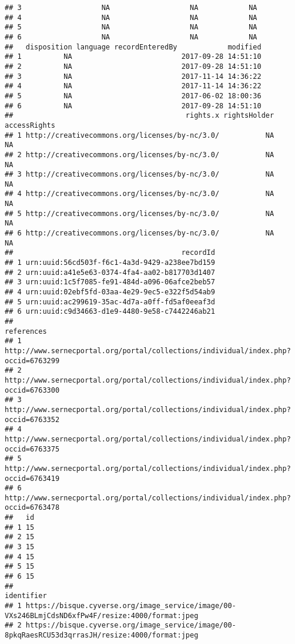 \documentclass[
]{article}
\begin{document}
\begin{verbatim}
## 3                   NA                   NA            NA                  
## 4                   NA                   NA            NA                  
## 5                   NA                   NA            NA                  
## 6                   NA                   NA            NA                  
##   disposition language recordEnteredBy            modified
## 1          NA                          2017-09-28 14:51:10
## 2          NA                          2017-09-28 14:51:10
## 3          NA                          2017-11-14 14:36:22
## 4          NA                          2017-11-14 14:36:22
## 5          NA                          2017-06-02 18:00:36
## 6          NA                          2017-09-28 14:51:10
##                                         rights.x rightsHolder accessRights
## 1 http://creativecommons.org/licenses/by-nc/3.0/           NA           NA
## 2 http://creativecommons.org/licenses/by-nc/3.0/           NA           NA
## 3 http://creativecommons.org/licenses/by-nc/3.0/           NA           NA
## 4 http://creativecommons.org/licenses/by-nc/3.0/           NA           NA
## 5 http://creativecommons.org/licenses/by-nc/3.0/           NA           NA
## 6 http://creativecommons.org/licenses/by-nc/3.0/           NA           NA
##                                        recordId
## 1 urn:uuid:56cd503f-f6c1-4a3d-9429-a238ee7bd159
## 2 urn:uuid:a41e5e63-0374-4fa4-aa02-b817703d1407
## 3 urn:uuid:1c5f7085-fe91-484d-a096-06afce2beb57
## 4 urn:uuid:02ebf5fd-03aa-4e29-9ec5-e322f5d54ab9
## 5 urn:uuid:ac299619-35ac-4d7a-a0ff-fd5af0eeaf3d
## 6 urn:uuid:c9d34663-d1e9-4480-9e58-c7442246ab21
##                                                                          references
## 1 http://www.sernecportal.org/portal/collections/individual/index.php?occid=6763299
## 2 http://www.sernecportal.org/portal/collections/individual/index.php?occid=6763300
## 3 http://www.sernecportal.org/portal/collections/individual/index.php?occid=6763352
## 4 http://www.sernecportal.org/portal/collections/individual/index.php?occid=6763375
## 5 http://www.sernecportal.org/portal/collections/individual/index.php?occid=6763419
## 6 http://www.sernecportal.org/portal/collections/individual/index.php?occid=6763478
##   id
## 1 15
## 2 15
## 3 15
## 4 15
## 5 15
## 6 15
##                                                                                         identifier
## 1 https://bisque.cyverse.org/image_service/image/00-VXs246BLmjCdsND6xfPw4F/resize:4000/format:jpeg
## 2 https://bisque.cyverse.org/image_service/image/00-8pkqRaesRCU53d3qrrasJH/resize:4000/format:jpeg

\end{verbatim}
\end{document}
